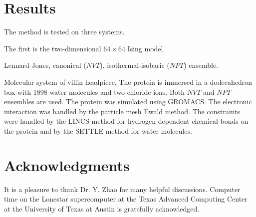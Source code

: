 \documentclass[aip,jcp,preprint,superscriptaddress]{revtex4-1}
\begin{document}
\section{Results}



The method is tested on three systems.


The first is the two-dimensional $64\times64$ Ising model.


Lennard-Jones, canonical ($NVT$), isothermal-isobaric ($NPT$) ensemble.



Molecular system of villin headpiece,
The protein is immersed in
a dodecahedron box with 1898 water molecules and two chloride ions.
%
Both $NVT$ and $NPT$ ensembles are used.
%
The protein was simulated
using GROMACS\cite{
  berendsen1995, *lindahl2001, *vanderspoel2005, *hess2008}.
%
The electronic interaction was
handled by the particle mesh Ewald method\cite{
  essmann1995}.
%
The constraints were handled by the LINCS method\cite{
  hess1997}
for hydrogen-dependent chemical bonds on the protein
and by the SETTLE method\cite{
  miyamoto1992}
for water molecules.





\section{Acknowledgments}



It is a pleasure to thank Dr. Y. Zhao
for many helpful discussions.
%
Computer time on the Lonestar supercomputer
at the Texas Advanced Computing Center
at the University of Texas at Austin
is gratefully acknowledged.




\end{document}
